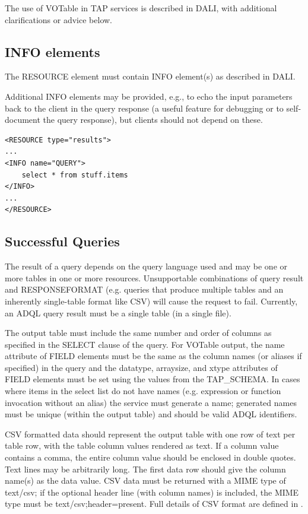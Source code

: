 \documentclass[11pt,letter]{ivoa}
\newcommand{\tapschema}{TAP\_SCHE\-MA}
\newcommand{\tapschema}{\mbox{%
  \relsize{-0.5}TAP\discretionary{-}{}{\kern-2pt\_}SCHEMA}}
\begin{document}
The use of VOTable in TAP services is described in DALI, with additional clarifications
or advice below.

\subsection{INFO elements}
\label{sec:vot-info}

The RESOURCE element must contain INFO element(s) as described in DALI.

Additional INFO elements may be provided, e.g., to echo the input parameters 
back to the client in the query response (a useful feature for debugging or to 
self-document the query response), but clients should not depend on these. 

\begin{verbatim}
<RESOURCE type="results">
...
<INFO name="QUERY">
    select * from stuff.items
</INFO>
...
</RESOURCE>
\end{verbatim}

\subsection{Successful Queries}
\label{sec:query-ok}

The result of a query depends on the query language used and may be one or more 
tables in one or more resources. Unsupportable combinations of query result and 
RESPONSEFORMAT (e.g. queries that produce multiple tables and an inherently 
single-table format like CSV) will cause the request to fail. Currently, an ADQL 
query result must be a single table (in a single file).

The output table must include the same number and order of columns as specified 
in the SELECT clause of the query. For VOTable output, the name attribute of 
FIELD elements must be the same as the column names (or aliases if specified)  
in the query and the datatype, arraysize, and xtype 
attributes of FIELD elements must be set using the values from the \tapschema. 
In cases where items in the select list do not 
have names (e.g. expression or function invocation without an alias) the service 
must generate a name; 
generated names must be unique (within the output table) and should be valid 
ADQL identifiers.

CSV formatted data should represent the output table with one row of text per 
table row, with the table column values rendered as text. 
If a column value contains a comma, the entire column value should be 
enclosed in double quotes.  Text lines may be arbitrarily long.  The first data 
row should give the column name(s) as the data value.   CSV data must be returned 
with a MIME type of text/csv; if the optional header line (with column names) 
is included, the MIME type must be text/csv;header=present. Full details of CSV 
format are defined in \citet{std:CSV}.
\end{document}
